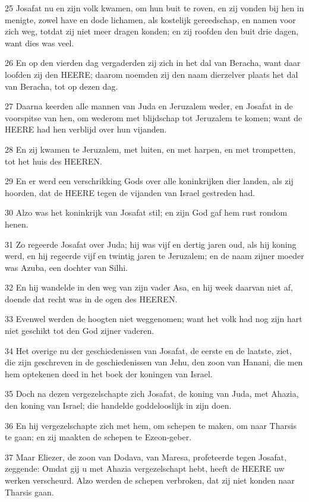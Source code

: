 \par 25 Josafat nu en zijn volk kwamen, om hun buit te roven, en zij vonden bij hen in menigte, zowel have en dode lichamen, als kostelijk gereedschap, en namen voor zich weg, totdat zij niet meer dragen konden; en zij roofden den buit drie dagen, want dies was veel.
\par 26 En op den vierden dag vergaderden zij zich in het dal van Beracha, want daar loofden zij den HEERE; daarom noemden zij den naam dierzelver plaats het dal van Beracha, tot op dezen dag.
\par 27 Daarna keerden alle mannen van Juda en Jeruzalem weder, en Josafat in de voorspitse van hen, om wederom met blijdschap tot Jeruzalem te komen; want de HEERE had hen verblijd over hun vijanden.
\par 28 En zij kwamen te Jeruzalem, met luiten, en met harpen, en met trompetten, tot het huis des HEEREN.
\par 29 En er werd een verschrikking Gods over alle koninkrijken dier landen, als zij hoorden, dat de HEERE tegen de vijanden van Israel gestreden had.
\par 30 Alzo was het koninkrijk van Josafat stil; en zijn God gaf hem rust rondom henen.
\par 31 Zo regeerde Josafat over Juda; hij was vijf en dertig jaren oud, als hij koning werd, en hij regeerde vijf en twintig jaren te Jeruzalem; en de naam zijner moeder was Azuba, een dochter van Silhi.
\par 32 En hij wandelde in den weg van zijn vader Asa, en hij week daarvan niet af, doende dat recht was in de ogen des HEEREN.
\par 33 Evenwel werden de hoogten niet weggenomen; want het volk had nog zijn hart niet geschikt tot den God zijner vaderen.
\par 34 Het overige nu der geschiedenissen van Josafat, de eerste en de laatste, ziet, die zijn geschreven in de geschiedenissen van Jehu, den zoon van Hanani, die men hem optekenen deed in het boek der koningen van Israel.
\par 35 Doch na dezen vergezelschapte zich Josafat, de koning van Juda, met Ahazia, den koning van Israel; die handelde goddelooslijk in zijn doen.
\par 36 En hij vergezelschapte zich met hem, om schepen te maken, om naar Tharsis te gaan; en zij maakten de schepen te Ezeon-geber.
\par 37 Maar Eliezer, de zoon van Dodava, van Maresa, profeteerde tegen Josafat, zeggende: Omdat gij u met Ahazia vergezelschapt hebt, heeft de HEERE uw werken verscheurd. Alzo werden de schepen verbroken, dat zij niet konden naar Tharsis gaan.

